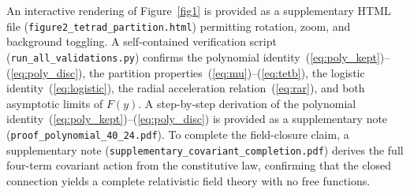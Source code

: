 \documentclass[twocolumn]{iopjournal}
\begin{document}
An interactive rendering of Figure~\ref{fig1} is provided as
a supplementary HTML file
(\texttt{figure2\_tetrad\_partition.html}) permitting
rotation, zoom, and background toggling.  A self-contained verification script
(\texttt{run\_all\_validations.py}) confirms the polynomial
identity~(\ref{eq:poly_kept})--(\ref{eq:poly_disc}), the partition
properties~(\ref{eq:mu})--(\ref{eq:tetb}), the logistic
identity~(\ref{eq:logistic}), the radial acceleration
relation~(\ref{eq:rar}), and both asymptotic limits of
$F(y)$.  A step-by-step derivation of the polynomial
identity~(\ref{eq:poly_kept})--(\ref{eq:poly_disc}) is
provided as a supplementary note
(\texttt{proof\_polynomial\_40\_24.pdf}).  To complete the
field-closure claim, a supplementary
note (\texttt{supplementary\_covariant\_completion.pdf})
derives the full four-term covariant action from the
constitutive law, confirming that the closed connection yields
a complete relativistic field theory with no free functions.

\end{document}
